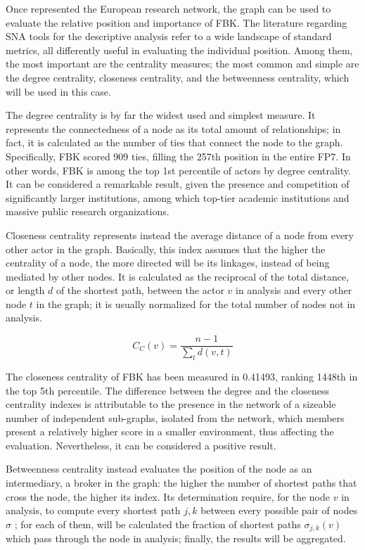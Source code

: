 Once represented the European research network, the graph can be used to evaluate the relative position and importance of FBK. The literature regarding SNA tools for the descriptive analysis refer to a wide landscape of standard metrics, all differently useful in evaluating the individual position. Among them, the most important are the centrality measures; the most common and simple are the degree centrality, closeness centrality, and the betweenness centrality, which will be used in this case.

The degree centrality is by far the widest used and simplest measure. It represents the connectedness of a node as its total amount of relationships; in fact, it is calculated as the number of ties that connect the node to the graph. Specifically, FBK scored 909 ties, filling the 257th position in the entire FP7. In other words, FBK is among the top 1st percentile of actors by degree centrality. It can be considered a remarkable result, given the presence and competition of significantly larger institutions, among which top-tier academic institutions and massive public research organizations. 

Closeness centrality represents instead the average distance of a node from every other actor in the graph. Basically, this index assumes that the higher the centrality of a node, the more directed will be its linkages, instead of being mediated by other nodes. It is calculated as the reciprocal of the total distance, or length $d$ of the shortest path, between the actor $v$ in analysis and every other node $t$ in the graph; it is usually normalized for the total number of nodes not in analysis. 

\[
	C_C (v) =
		\frac 
			{n-1}
			{
				\sum_t d(v, t)
			} 
\]

The closeness centrality of FBK has been measured in 0.41493, ranking 1448th in the top 5th percentile. The difference between the degree and the closeness centrality indexes is attributable to the presence in the network of a sizeable number of independent sub-graphs, isolated from the network, which members present a relatively higher score in a smaller environment, thus affecting the evaluation. Nevertheless, it can be considered a positive result.  

Betweenness centrality instead evaluates the position of the node as an intermediary, a broker in the graph: the higher the number of shortest paths that cross the node, the higher its index. Its determination require, for the node $v$ in analysis, to compute every shortest path $j,k$ between every possible pair of nodes $\sigma$ ; for each of them, will be calculated the fraction of shortest paths $\sigma_{j,k} (v)$ which pass through the node in analysis; finally, the results will be aggregated. 

